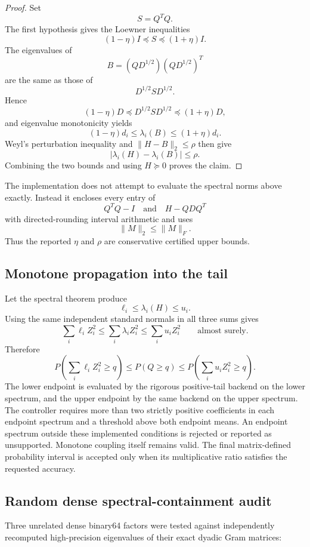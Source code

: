 \begin{proof}
Set
\[
S=Q^TQ.
\]
The first hypothesis gives the Loewner inequalities
\[
(1-\eta)I\preceq S\preceq(1+\eta)I.
\]
The eigenvalues of
\[
B=(QD^{1/2})(QD^{1/2})^T
\]
are the same as those of
\[
D^{1/2}SD^{1/2}.
\]
Hence
\[
(1-\eta)D
\preceq
D^{1/2}SD^{1/2}
\preceq
(1+\eta)D,
\]
and eigenvalue monotonicity yields
\[
(1-\eta)d_i
\le
\lambda_i(B)
\le
(1+\eta)d_i.
\]
Weyl's perturbation inequality and
\(\|H-B\|_2\le\rho\) then give
\[
|\lambda_i(H)-\lambda_i(B)|\le\rho.
\]
Combining the two bounds and using \(H\succeq0\) proves the claim.
\end{proof}

The implementation does not attempt to evaluate the spectral norms above
exactly.  Instead it encloses every entry of
\[
Q^TQ-I
\quad\text{and}\quad
H-QDQ^T
\]
with directed-rounding interval arithmetic and uses
\[
\|M\|_2\le\|M\|_F.
\]
Thus the reported \(\eta\) and \(\rho\) are conservative certified upper
bounds.

\subsection{Monotone propagation into the tail}

Let the spectral theorem produce
\[
\ell_i\le\lambda_i(H)\le u_i.
\]
Using the same independent standard normals in all three sums gives
\[
\sum_i\ell_iZ_i^2
\le
\sum_i\lambda_iZ_i^2
\le
\sum_i u_iZ_i^2
\qquad\text{almost surely}.
\]
Therefore
\[
\boxed{
P\!\left(\sum_i\ell_iZ_i^2\ge q\right)
\le
P(Q\ge q)
\le
P\!\left(\sum_i u_iZ_i^2\ge q\right).
}
\]
The lower endpoint is evaluated by the rigorous positive-tail backend on the
lower spectrum, and the upper endpoint by the same backend on the upper
spectrum.  The controller requires more than two strictly positive
coefficients in each endpoint spectrum and a threshold above both endpoint
means.  An endpoint spectrum outside these implemented conditions is rejected
or reported as unsupported. Monotone coupling itself remains valid.  The final matrix-defined probability interval is accepted only when
its multiplicative ratio satisfies the requested accuracy.

\subsection{Random dense spectral-containment audit}

Three unrelated dense binary64 factors were tested against independently
recomputed high-precision eigenvalues of their exact dyadic Gram matrices:

